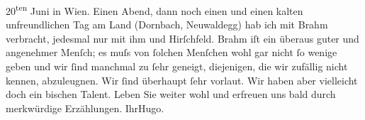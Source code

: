 \begin{ledgroupsized}[t]{13cm}
                            20\textsuperscript{ten} Juni in Wien. Einen Abend, dann noch einen und einen kalten
                    unfreundlichen Tag am Land (Dornbach, Neuwaldegg) hab ich mit Brahm verbracht, jedesmal {\pb}nur mit ihm und Hirſchfeld. Brahm iſt ein überaus guter und angenehmer Menſch; es muſs von ſolchen
                    Menſchen wohl gar nicht ſo wenige geben und wir ſind manchmal zu ſehr geneigt,
                    diejenigen, die wir zufällig nicht kennen, abzuleugnen. Wir ſind überhaupt ſehr
                    vorlaut. Wir haben aber vielleicht doch ein bischen Talent.\pend
           \pstart
           Leben Sie weiter wohl und erfreuen uns bald durch merkwürdige Erzählungen.\pend
           \pstart Ihr\spacefill\mbox{Hugo.}\pend{}\endnumbering{}\end{ledgroupsized}  \newcommand{\dateiname}{L00677}\newcommand{\titel}{Hugo von Hofmannsthal an Arthur Schnitzler, 17. 5. [1897]}\newcommand{\editorInnen}{Martin Anton Müller und Gerd-Hermann Susen}
      